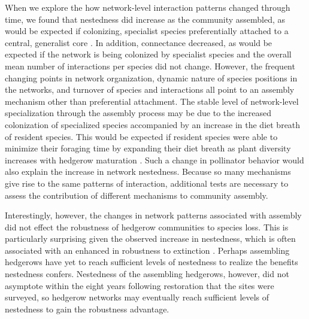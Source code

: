 \documentclass[12pt]{article}
\begin{document}
When we explore the how network-level interaction patterns changed
through time, we found that nestedness did increase as the community
assembled, as would be expected if colonizing, specialist species
preferentially attached to a central, generalist core
\citep{albrecht2010plant}. In addition, connectance decreased, as
would be expected if the network is being colonized by specialist
species and the overall mean number of interactions per species did
not change. However, the frequent changing points in network
organization, dynamic nature of species positions in the networks, and
turnover of species and interactions all point to an assembly
mechanism other than preferential attachment.  The stable level of
network-level specialization through the assembly process may be due
to the increased colonization of specialized species
\citep{mgonigle-2015-x} accompanied by an increase in the diet breath
of resident species. This would be expected if resident species were
able to minimize their foraging time by expanding their diet breath as
plant diversity increases with hedgerow maturation \citep{Waser1996,
  pyke1984optimal, Bluthgen2007, albrecht2010plant}. Such a change in
pollinator behavior would also explain the increase in network
nestedness. Because so many mechanisms give rise to the same patterns
of interaction, additional tests are necessary to assess the
contribution of different mechanisms to community assembly.

Interestingly, however, the changes in network patterns associated
with assembly did not effect the robustness of hedgerow communities to
species loss. This is particularly surprising given the observed
increase in nestedness, which is often associated with an enhanced in
robustness to extinction \citep{Memmott2004}. Perhaps assembling
hedgerows have yet to reach sufficient levels of nestedness to realize
the benefits nestedness confers. Nestedness of the assembling
hedgerows, however, did not asymptote within the eight years following
restoration that the sites were surveyed, so hedgerow networks may
eventually reach sufficient levels of nestedness to gain the
robustness advantage.
\end{document}
